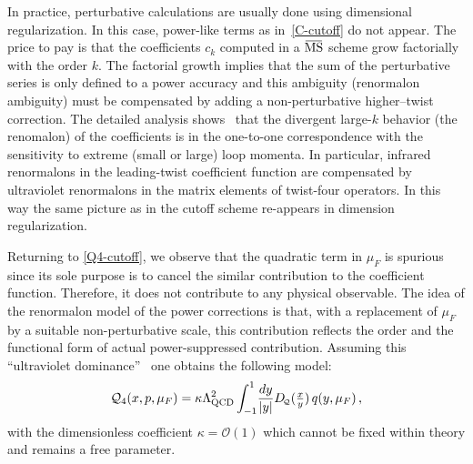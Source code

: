In practice, perturbative calculations are usually done using dimensional regularization. In this case, power-like terms as in~\eqref{C-cutoff} do not appear. The price to pay is that the coefficients $c_k$ computed in a $\MSbar$ scheme grow factorially with the order $k$. The factorial growth implies that the sum of the perturbative series is only defined to a power accuracy and this ambiguity (renormalon ambiguity) must be compensated by adding a non-perturbative higher--twist correction. The detailed analysis shows~\cite{Beneke:1998ui,Beneke:2000kc} that the divergent large-$k$ behavior (the renomalon) of the coefficients is in the one-to-one correspondence with the sensitivity to extreme (small or large) loop momenta. In particular, infrared renormalons in  the leading-twist coefficient function are compensated by ultraviolet renormalons in the matrix elements of twist-four operators. In this way the same picture as in the cutoff scheme re-appears in dimension regularization.

Returning to \eqref{Q4-cutoff}, we observe that the quadratic term in $\mu_F$ is spurious since its sole purpose is to cancel the similar contribution to the coefficient function. Therefore, it does not contribute to any physical observable. The idea of the renormalon model of the power corrections \cite{Beneke:1995pq,Dokshitzer:1995qm,Dasgupta:1996hh,Dasgupta:1996ki,Beneke:1997sr,Braun:2004bu} is that, with a replacement of $\mu_F$ by a suitable non-perturbative scale, this contribution reflects the order and the functional form of actual power-suppressed contribution. Assuming this ``ultraviolet dominance''~\cite{Braun:1995tp,Beneke:1998ui,Beneke:2000kc} one obtains the following  model:
\begin{equation}
 \mathcal{Q}_4(x,p,\mu_F) = \kappa 
\Lambda_{\rm QCD}^2 \int_{-1}^1 \!\frac{dy}{|y|} D_{\!\scriptscriptstyle \mathcal{Q}}(\tfrac{x}{y})\, q(y,\mu_F)\,,
\label{UV_Lambda_int}
\end{equation}
with the dimensionless coefficient $\kappa = \mathcal{O}(1)$ which cannot be fixed within theory and remains a free parameter.

